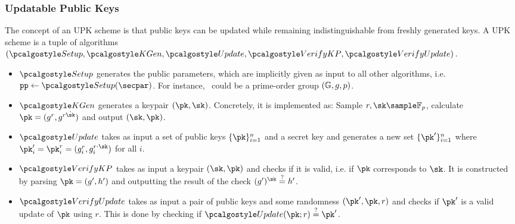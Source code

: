 \subsubsection{Updatable Public Keys} \label{UPK}

The concept of an UPK scheme is that public keys can be updated while remaining indistinguishable from freshly generated keys.
A UPK scheme is a tuple of algorithms $(\setup, \kgen, \upd, \verkp, \verupd)$. 

\begin{itemize}
    \item $\setup$ generates the public parameters, which are implicitly given as input to all other algorithms, i.e. $\params \gets \setup(\secpar)$. For instance, \params\ could be a prime-order group $(\mathbb{G}, g, p)$.
    \item $\kgen$ generates a keypair $(\pk,\sk)$.
    Concretely, it is implemented as:
    Sample $r, \sk \sample \mathbb{F}_p$, calculate $\pk = (g^r, g^{r \dot \sk})$ and output $(\sk,\pk)$.
    \item $\upd$ takes as input a set of public keys $\{\pk\}_{i=1}^n$ and a secret key and generates a new set $\{\pk'\}_{i=1}^n$ where $\pk'_i = \pk_i ^ r = (g_i^r, g_i^{r \cdot \sk})$ for all $i$.
    \item $\verkp$ takes as input a keypair $(\sk, \pk)$ and checks if it is valid, i.e. if $\pk$ corresponds to $\sk$.
    It is constructed by parsing $\pk=(g',h')$ and outputting the result of the check $(g')^\sk \overset{?}{=} h'$.
    \item $\verupd$ takes as input a pair of public keys and some randomness $(\pk', \pk, r)$ and checks if $\pk'$ is a valid update of $\pk$ using $r$. This is done by checking if $\upd(\pk;r) \overset{?}{=} \pk'$.
\end{itemize}

